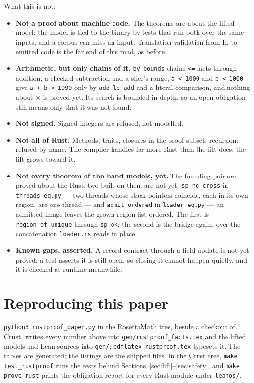 \documentclass[11pt]{article}
\begin{document}
What this is not:

\begin{itemize}
\item \textbf{Not a proof about machine code.}  The theorems are about the
  lifted model; the model is tied to the binary by tests that run both over
  the same inputs, and a corpus can miss an input.  Translation validation
  from IL to emitted code is the far end of this road, as before.
\item \textbf{Arithmetic, but only chains of it.}  \texttt{by\_bounds}
  chains \texttt{<=} facts through addition, a checked subtraction and a
  slice's range; \texttt{a < 1000} and \texttt{b < 1000} give
  \texttt{a + b < 1999} only by \texttt{add\_le\_add} and a literal
  comparison, and nothing about $\times$ is proved yet.  Its search is
  bounded in depth, so an open obligation still means only that it was not
  found.
\item \textbf{Not signed.}  Signed integers are refused, not modelled.
\item \textbf{Not all of Rust.}  Methods, traits, closures in the proof
  subset, recursion: refused by name.  The compiler handles far more Rust
  than the lift does; the lift grows toward it.
\item \textbf{Not every theorem of the hand models, yet.}  The founding
  pair are proved about the Rust; two built on them are not yet:
  \texttt{sp\_no\_cross} in \texttt{threads\_eq.py} --- two threads whose
  stack pointers coincide, each in its own region, are one thread --- and
  \texttt{admit\_ordered} in \texttt{loader\_eq.py} --- an admitted
  image leaves the grown region list ordered.  The first is
  \texttt{region\_of\_unique} through \texttt{sp\_ok}; the second is the
  bridge again, over the concatenation \texttt{loader.rs} reads in place.
\item \textbf{Known gaps, asserted.}  A record contract through a field
  update is not yet proved; a test asserts it is still open, so closing it
  cannot happen quietly, and it is checked at runtime meanwhile.
\end{itemize}

\appendix
\footnotesize
\section{Reproducing this paper}

\texttt{python3 rustproof\_paper.py} in the RosettaMath tree, beside a
checkout of Crust, writes every number above into
\texttt{gen/rustproof\_facts.tex} and the lifted models and Lean sources
into \texttt{gen/}; \texttt{pdflatex rustproof.tex} typesets it.  The
tables are generated; the listings are the shipped files.  In the Crust
tree, \texttt{make test\_rustproof} runs the \rustproofTests{} tests behind
Sections~\ref{sec:lift}--\ref{sec:safety}, and \texttt{make prove\_rust}
prints the obligation report for every Rust module under \texttt{leanos/}.
\end{document}
